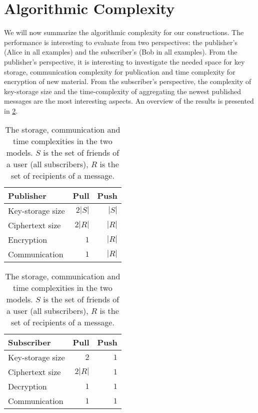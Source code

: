 \section{Algorithmic Complexity}\label{AlgComplexity}

We will now summarize the algorithmic complexity for our constructions.
The performance is interesting to evaluate from two perspectives: the 
publisher's (Alice in all examples) and the subscriber's (Bob in all examples).
From the publisher's perspective, it is interesting to investigate the needed 
space for key storage, communication complexity for publication and time 
complexity for encryption of new material.
From the subscriber's perspective, the complexity of key-storage size and the 
time-complexity of aggregating the newest published messages are the most 
interesting aspects.
An overview of the results is presented in \cref{Complexities}.

\begin{table}
  \centering
  \caption{%
    The storage, communication and time complexities in the two models.
    \(S\) is the set of friends of a user (all subscribers), \(R\) is the set 
    of recipients of a message.
  }\label{Complexities}
  \begin{tabular}{lrr}
    Publisher
    & Pull
    & Push \\
    
    \toprule

    Key-storage size
    & \(2|S|\) & \(|S|\) \\

    \pause{}%
    Ciphertext size
    & \(2|R|\) & \(|R|\) \\

    Encryption
    & \(1\) & \(|R|\) \\

    \pause{}%
    Communication
    & \(1\) & \(|R|\) \\

    \bottomrule

  \end{tabular}
  \begin{tabular}{lrr}
    Subscriber
    & Pull & Push \\
    
    \toprule

    Key-storage size
    & \(2\) & \(1\) \\

    \pause{}%
    Ciphertext size
    & \(2|R|\) & \(1\) \\

    Decryption
    & \(1\) & \(1\) \\

    \pause{}%
    Communication
    & \(1\) & \(1\) \\

    \bottomrule

  \end{tabular}
\end{table}

